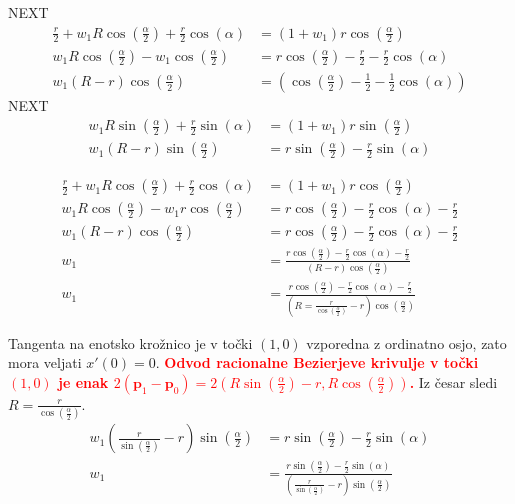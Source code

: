 \documentclass[isrm2, tisk]{fmfdelo}
\newcommand{\p}{\textbf{p}}
\newcommand{\mycomment}[1]{\textbf{\textcolor{red}{#1}}}
\begin{document}
    NEXT
    \begin{align*}
        \frac{r}{2} + w_1R\cos\left(\frac{\alpha}{2}\right) + \frac{r}{2}\cos(\alpha) &= (1+w_1)r\cos\left(\frac{\alpha}{2}\right) \\
        w_1R\cos\left(\frac{\alpha}{2}\right) - w_1\cos\left(\frac{\alpha}{2}\right) &= r\cos\left(\frac{\alpha}{2}\right)-\frac{r}{2} - \frac{r}{2}\cos(\alpha) \\
        w_1(R-r)\cos\left(\frac{\alpha}{2}\right) &= \left(\cos\left(\frac{\alpha}{2}\right)-\frac{1}{2} - \frac{1}{2}\cos(\alpha)\right)
    \end{align*}
    NEXT
    \begin{align*}
        w_1R\sin\left(\frac{\alpha}{2}\right) + \frac{r}{2}\sin(\alpha) &= (1+w_1)r\sin\left(\frac{\alpha}{2}\right) \\
        w_1(R-r)\sin\left(\frac{\alpha}{2}\right)  &= r\sin\left(\frac{\alpha}{2}\right) - \frac{r}{2}\sin(\alpha)
    \end{align*}

    \begin{align*}
        \frac{r}{2} + w_1R\cos\left(\frac{\alpha}{2}\right) + \frac{r}{2}\cos(\alpha) &=(1+w_1) r\cos\left(\frac{\alpha}{2}\right) \\
        w_1R\cos\left(\frac{\alpha}{2}\right) - w_1r\cos\left(\frac{\alpha}{2}\right) &= r\cos\left(\frac{\alpha}{2}\right)-\frac{r}{2}\cos(\alpha)-\frac{r}{2} \\
        w_1(R-r)\cos\left(\frac{\alpha}{2}\right) &= r\cos\left(\frac{\alpha}{2}\right)-\frac{r}{2}\cos(\alpha)-\frac{r}{2} \\
        w_1 &=\frac{r\cos\left(\frac{\alpha}{2}\right)-\frac{r}{2}\cos(\alpha)-\frac{r}{2}}{(R-r)\cos\left(\frac{\alpha}{2}\right)}\\
        w_1 &=\frac{r\cos\left(\frac{\alpha}{2}\right)-\frac{r}{2}\cos(\alpha)-\frac{r}{2}}{(R=\frac{r}{\cos\left(\frac{\alpha}{2}\right)}-r)\cos\left(\frac{\alpha}{2}\right)}
    \end{align*}

    Tangenta na enotsko krožnico je v točki $(1,0)$ vzporedna z ordinatno osjo, zato mora veljati $x'(0)=0$.
   \mycomment{Odvod racionalne Bezierjeve krivulje v točki $(1,0)$ je enak $2(\p_{1}-\p_{0}) = 2\left(R\sin\left(\frac{\alpha}{2}\right)-r,R\cos\left(\frac{\alpha}{2}\right)\right)$.}
    Iz česar sledi $R=\frac{r}{\cos\left(\frac{\alpha}{2}\right)}$.
    \begin{align*}
        w_1\left(\frac{r}{\sin\left(\frac{\alpha}{2}\right)}-r\right)\sin\left(\frac{\alpha}{2}\right)  &= r\sin\left(\frac{\alpha}{2}\right) - \frac{r}{2}\sin(\alpha) \\
        w_1 &= \frac{r\sin\left(\frac{\alpha}{2}\right) - \frac{r}{2}\sin(\alpha)}{\left(\frac{r}{\sin\left(\frac{\alpha}{2}\right)}-r\right)\sin\left(\frac{\alpha}{2}\right) }
    \end{align*}
\end{document}
